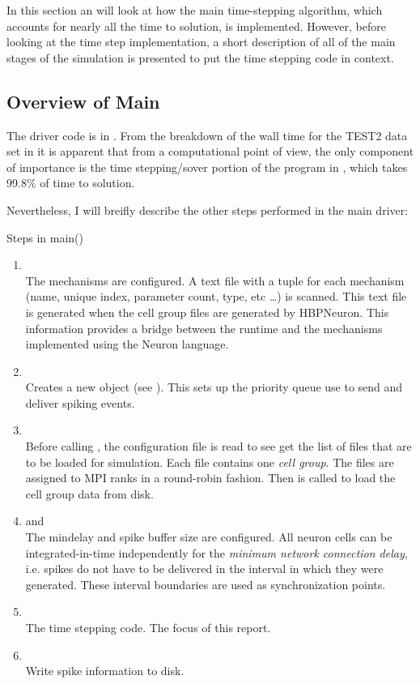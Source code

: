 In this section an will look at how the main time-stepping algorithm, which accounts for nearly all the time to solution, is implemented. However, before looking at the time step implementation, a short description of all of the main stages of the simulation is presented to put the time stepping code in context.
\subsection{Overview of Main}
The driver code is in . From the breakdown of the wall time for the TEST2 data set in  it is apparent that from a computational point of view, the only component of importance is the time stepping/sover portion of the program in , which takes 99.8\% of time to solution.

Nevertheless, I will breifly describe the other steps performed in the main driver:
\begin{infobox}{Steps in main()}
\begin{enumerate}[leftmargin=*]
\item {}\\
The mechanisms are configured. A text file with a tuple for each mechanism (name, unique index, parameter count, type,  etc \dots) is scanned. This text file is generated when the cell group files are generated by HBPNeuron. This information provides a bridge between the runtime and the mechanisms implemented using the Neuron \hoc language.
\item {}\\
    Creates a new  object (see ). This sets up the priority queue use to send and deliver spiking events.
\item {}\\
    Before calling , the configuration file  is read to see get the list of files that are to be loaded for simulation. Each file contains one \emph{cell group}. The files are assigned to MPI ranks in a round-robin fashion. Then  is called to load the cell group data from disk.
\item {} and \\
    The mindelay and spike buffer size are configured. All neuron cells can be integrated-in-time independently for the \emph{minimum network connection delay}, i.e. spikes do not have to be delivered in the interval in which they were generated. These interval boundaries are used as synchronization points.
\item {} \\
    The time stepping code. The focus of this report.
\item {} \\
    Write spike information to disk.
\end{enumerate}
\end{infobox}

